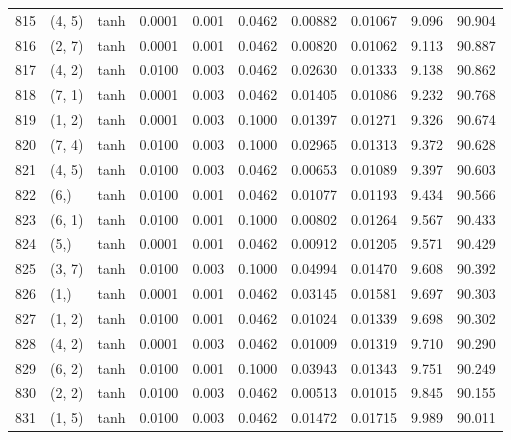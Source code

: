 \begin{tabular}{lllrrrrrrr}
815 &      (4, 5) &      tanh &  0.0001 &  0.001 &  0.0462 &          0.00882 &    0.01067 &       9.096 &    90.904 \\
816 &      (2, 7) &      tanh &  0.0001 &  0.001 &  0.0462 &          0.00820 &    0.01062 &       9.113 &    90.887 \\
817 &      (4, 2) &      tanh &  0.0100 &  0.003 &  0.0462 &          0.02630 &    0.01333 &       9.138 &    90.862 \\
818 &      (7, 1) &      tanh &  0.0001 &  0.003 &  0.0462 &          0.01405 &    0.01086 &       9.232 &    90.768 \\
819 &      (1, 2) &      tanh &  0.0001 &  0.003 &  0.1000 &          0.01397 &    0.01271 &       9.326 &    90.674 \\
820 &      (7, 4) &      tanh &  0.0100 &  0.003 &  0.1000 &          0.02965 &    0.01313 &       9.372 &    90.628 \\
821 &      (4, 5) &      tanh &  0.0100 &  0.003 &  0.0462 &          0.00653 &    0.01089 &       9.397 &    90.603 \\
822 &        (6,) &      tanh &  0.0100 &  0.001 &  0.0462 &          0.01077 &    0.01193 &       9.434 &    90.566 \\
823 &      (6, 1) &      tanh &  0.0100 &  0.001 &  0.1000 &          0.00802 &    0.01264 &       9.567 &    90.433 \\
824 &        (5,) &      tanh &  0.0001 &  0.001 &  0.0462 &          0.00912 &    0.01205 &       9.571 &    90.429 \\
825 &      (3, 7) &      tanh &  0.0100 &  0.003 &  0.1000 &          0.04994 &    0.01470 &       9.608 &    90.392 \\
826 &        (1,) &      tanh &  0.0001 &  0.001 &  0.0462 &          0.03145 &    0.01581 &       9.697 &    90.303 \\
827 &      (1, 2) &      tanh &  0.0100 &  0.001 &  0.0462 &          0.01024 &    0.01339 &       9.698 &    90.302 \\
828 &      (4, 2) &      tanh &  0.0001 &  0.003 &  0.0462 &          0.01009 &    0.01319 &       9.710 &    90.290 \\
829 &      (6, 2) &      tanh &  0.0100 &  0.001 &  0.1000 &          0.03943 &    0.01343 &       9.751 &    90.249 \\
830 &      (2, 2) &      tanh &  0.0100 &  0.003 &  0.0462 &          0.00513 &    0.01015 &       9.845 &    90.155 \\
831 &      (1, 5) &      tanh &  0.0100 &  0.003 &  0.0462 &          0.01472 &    0.01715 &       9.989 &    90.011 \\

\end{tabular}
